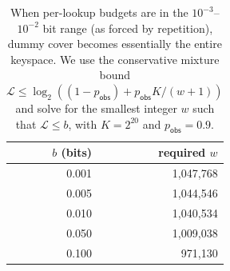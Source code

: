 \documentclass[11pt]{article}
\newcommand{\MaxL}{\mathcal{L}}
\newcommand{\logtwo}{\log_2}
\begin{document}
\begin{table}[t]
\centering
\caption{When per-lookup budgets are in the $10^{-3}$--$10^{-2}$ bit range (as forced by repetition), dummy cover becomes essentially the entire keyspace. We use the conservative mixture bound $\MaxL\le\logtwo((1-p_{\mathsf{obs}})+p_{\mathsf{obs}}K/(w{+}1))$ and solve for the smallest integer $w$ such that $\MaxL\le b$, with $K=2^{20}$ and $p_{\mathsf{obs}}=0.9$.}
\label{tab:tiny-budget-impossible}
\begin{tabular}{r r}
\toprule
$b$ (bits) & required $w$\\
\midrule
0.001 & 1,047,768\\
0.005 & 1,044,546\\
0.010 & 1,040,534\\
0.050 & 1,009,038\\
0.100 & 971,130\\
\bottomrule
\end{tabular}
\end{table}
\end{document}
